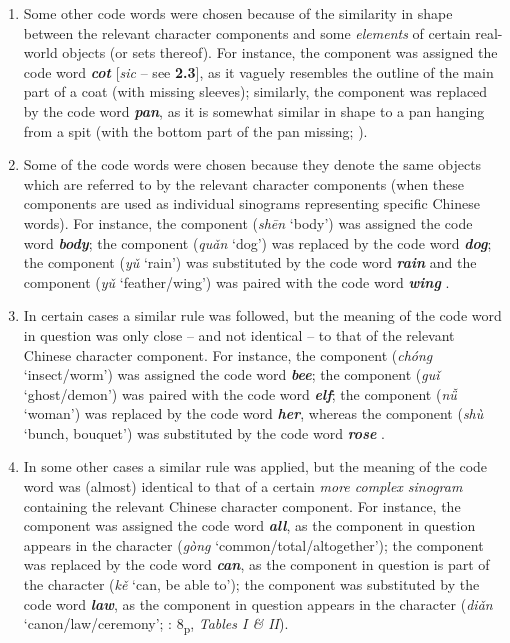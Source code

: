 \documentclass[output=paper,colorlinks,citecolor=brown,arabicfont,chinesefont]{langscibook}
\begin{document}
\begin{enumerate}
    \item Some other code words were chosen because of the similarity in shape between the relevant character components and some \emph{elements} of certain real-world objects (or sets thereof). For instance, the component {} was assigned the code word \textbf{\emph{cot}} [\emph{sic} – see \textbf{2.3}], as it vaguely resembles the outline of the main part of a coat (with missing sleeves); similarly, the component {} was replaced by the code word \textbf{\emph{pan}}, as it is somewhat similar in shape to a pan hanging from a spit (with the bottom part of the pan missing; \citep[4-5\textsubscript{p}, \emph{Tables I \& II}]{Wieluch1936}).
    \item Some of the code words were chosen because they denote the same objects which are referred to by the relevant character components (when these components are used as individual sinograms representing specific Chinese words). For instance, the component {} (\emph{shēn} ‘body’) was assigned the code word \textbf{\emph{body}}; the component {} (\emph{quǎn} ‘dog’) was replaced by the code word \textbf{\emph{dog}}; the component {} (\emph{yǔ} ‘rain’) was substituted by the code word \textbf{\emph{rain}} and the component {} (\emph{yǔ} ‘feather/wing’) was paired with the code word \textbf{\emph{wing}} \citep[5-7\textsubscript{p}, \emph{Tables I \& II})]{Wieluch1936}.
    \item In certain cases a similar rule was followed, but the meaning of the code word in question was only close – and not identical – to that of the relevant Chinese character component. For instance, the component {} (\emph{chóng} ‘insect/worm’) was assigned the code word \textbf{\emph{bee}}; the component {} (\emph{guǐ} ‘ghost/demon’) was paired with the code word \textbf{\emph{elf}}; the component {} (\emph{nǚ} ‘woman’) was replaced by the code word \textbf{\emph{her}}, whereas the component {} (\emph{shù} ‘bunch, bouquet’) was substituted by the code word \textbf{\emph{rose}} \citep[7-8\textsubscript{p}, \emph{Tables I \& II}]{Wieluch1936}.
    \item In some other cases a similar rule was applied, but the meaning of the code word was (almost) identical to that of a certain \emph{more complex sinogram} containing the relevant Chinese character component. For instance, the component {} was assigned the code word \textbf{\emph{all}}, as the component in question appears in the character {} (\emph{gòng} ‘common/total/altogether’); the component {} was replaced by the code word \textbf{\emph{can}}, as the component in question is part of the character {} (\emph{kě} ‘can, be able to’); the component {} was substituted by the code word \textbf{\emph{law}}, as the component in question appears in the character {} (\emph{diǎn} ‘canon/law/ceremony’; \citealt{Wieluch1936}: 8\textsubscript{p}, \emph{Tables I \& II}).

\end{enumerate}
\end{document}

